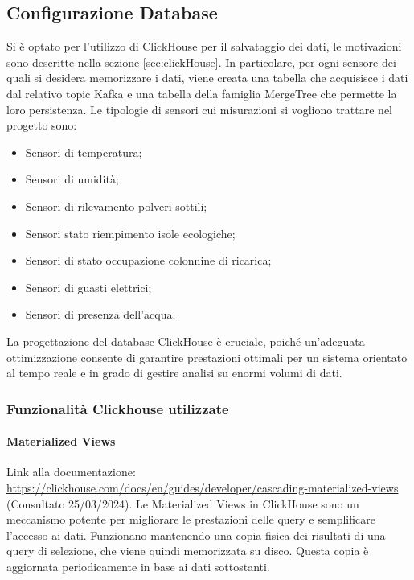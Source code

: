 
\subsection{Configurazione Database}
Si è optato per l'utilizzo di ClickHouse per il salvataggio dei dati, le motivazioni sono descritte nella sezione \ref{sec:clickHouse}. In particolare, per ogni sensore dei quali si desidera memorizzare i dati, viene creata una tabella che acquisisce i dati dal relativo topic Kafka e una tabella della famiglia MergeTree che permette la loro persistenza.
Le tipologie di sensori cui misurazioni si vogliono trattare nel progetto sono:
\begin{itemize}
    \item Sensori di temperatura;
    \item Sensori di umidità;
    \item Sensori di rilevamento polveri sottili; 
    \item Sensori stato riempimento isole ecologiche;
    \item Sensori di stato occupazione colonnine di ricarica;
    \item Sensori di guasti elettrici;
    \item Sensori di presenza dell'acqua.
\end{itemize}

La progettazione del database ClickHouse è cruciale, poiché un'adeguata ottimizzazione consente di garantire prestazioni ottimali per un sistema orientato al tempo reale e in grado di gestire analisi su enormi volumi di dati.


\subsubsection{Funzionalità Clickhouse utilizzate}
\paragraph{Materialized Views}
Link alla documentazione: \href{https://clickhouse.com/docs/en/guides/developer/cascading-materialized-views}{https://clickhouse.com/docs/en/guides/developer/cascading-materialized-views} (Consultato 25/03/2024).\newline
Le Materialized Views in ClickHouse sono un meccanismo potente per migliorare le prestazioni delle query e semplificare l'accesso ai dati. Funzionano mantenendo una copia fisica dei risultati di una query di selezione, che viene quindi memorizzata su disco. Questa copia è aggiornata periodicamente in base ai dati sottostanti.

